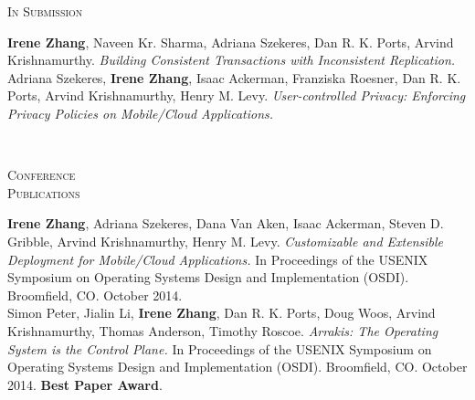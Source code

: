 \documentclass[10pt,times]{report}
\newlength{\sectiongap}
\newlength{\entrygap}
\newlength{\sectioncolwidth}
\newlength{\colgap}
\newlength{\stuffwidth}
\def\ifEqString#1#2{\def\testa{#1}\def\testb{#2}%
  \ifx\testa\testb}
\newenvironment{rtable}{
  \begin{minipage}{\textwidth}
  }{
  \end{minipage}
}
\newenvironment{rentry}[3][xxx]{
  \begin{minipage}[t]{\hsize}
    \textbf{#2}\ifEqString{#1}{xxx}\relax\else, \textit{#1}\fi
    \hspace{\stretch{1}} #3 \\
  }{
    \removelastskip
  \end{minipage}
  \\[\entrygap]  %
}
\newenvironment{rsection}[1]{
  \begin{minipage}[t]{\sectioncolwidth}
    \textsc{#1}
  \end{minipage}
  \hspace{\colgap}
  \begin{minipage}[t]{\stuffwidth}
  }{
    \removelastskip
  \end{minipage}
  \\[\sectiongap]
}
\begin{document}
\begin{rtable}

\begin{rsection}{In Submission}
  \textbf{Irene Zhang}, Naveen Kr. Sharma, Adriana Szekeres, Dan
  R. K. Ports,
  Arvind Krishnamurthy. \textit{Building Consistent Transactions with Inconsistent
    Replication.}\\

   Adriana Szekeres, \textbf{Irene Zhang}, Isaac Ackerman, Franziska Roesner,
   Dan R. K. Ports, Arvind Krishnamurthy, Henry M. Levy. \textit{User-controlled
     Privacy: Enforcing Privacy Policies on Mobile/Cloud
     Applications.}\\
\end{rsection}
  
 \begin{rsection}{Conference\\Publications}
   \textbf{Irene Zhang}, Adriana Szekeres, Dana Van Aken, Isaac
   Ackerman, Steven D. Gribble, Arvind Krishnamurthy, Henry
   M. Levy. \textit{Customizable and Extensible Deployment for
     Mobile/Cloud Applications.}  In Proceedings of the USENIX Symposium
   on Operating Systems Design and
   Implementation (OSDI). Broomfield, CO. October 2014.\\

   Simon Peter, Jialin Li, \textbf{Irene Zhang}, Dan R. K. Ports, Doug
   Woos, Arvind Krishnamurthy, Thomas Anderson, Timothy Roscoe.
   \textit{Arrakis: The Operating System is the Control Plane.}  In
   Proceedings of the USENIX Symposium on Operating Systems Design and
   Implementation (OSDI).
   Broomfield, CO. October 2014. \textbf{Best Paper
     Award}.\\


\end{rsection}
\end{rtable}
\end{document}
